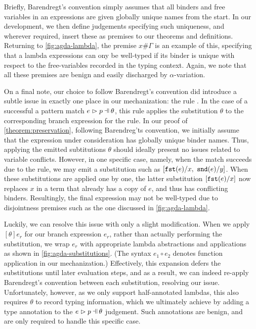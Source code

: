 Briefly, Barendregt's convention simply assumes that all binders and free variables in an expressions are given globally unique names from the start. In our development, we then define judgements specifying such uniqueness, and wherever required, insert these as premises to our theorems and definitions. Returning to \autoref{fig:agda-lambda}, the premise $x \# \Gamma$ is an example of this, specifying that a lambda expressions can ony be well-typed if its binder is unique with respect to the free-variables recorded in the typing context. Again, we note that all these premises are benign and easily discharged by $\alpha$-variation.

On a final note, our choice to follow Barendregt's convention did introduce a subtle issue in exactly one place in our mechanization: the rule \ITSuccMatch. In the case of a successful a pattern match $\hpatmatch{e}{p}{\theta}$, this rule applies the substitution $\theta$ to the corresponding branch expression for the rule. In our proof of \autoref{theorem:preservation}, following Barendreg'ts convention, we initially assume that the expression under consideration has globally unique binder names. Thus, applying the emitted subtitutions $\theta$ should ideally present no issues related to variable conflicts. However, in one specific case, namely, when the match succeeds due to the \MNotIntroPair rule, we may emit a substitution such as $[\mathtt{fst}(e) / x,~ \mathtt{snd}(e) / y]$. When these substitutions are applied one by one, the latter substitution $[\mathtt{fst}(e) / x]$ now replaces $x$ in a term that already has a copy of $e$, and thus has conflicting binders. Resultingly, the final expression may not be well-typed due to disjointness premises such as the one discussed in \autoref{fig:agda-lambda}.



Luckily, we can resolve this issue with only a slight modification. When we apply $[\theta]e_r$ for our branch expression $e_r$, rather than actually performing the substitution, we wrap $e_r$ with appropriate lambda abstractions and applications as shown in \autoref{fig:agda-substitutions}. (The syntax $e_1 \circ e_2$ denotes function application in our mechanization.) Effectively, this expansion defers the substitutions until later evaluation steps, and as a result, we can indeed re-apply Barendregt's convention between each substitution, resolving our issue. Unfortunately, however, as we only support half-annotated lambdas, this also requires $\theta$ to record typing information, which we ultimately achieve by adding a type annotation to the $\hpatmatch{e}{p}{\theta}$ judgement. Such annotations are benign, and are only required to handle this specific case.

